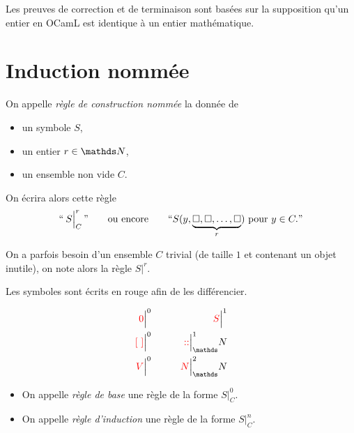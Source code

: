 Les preuves de correction et de terminaison sont basées sur la supposition qu'un entier en OCamL est identique à un entier mathématique.

\section{Induction nommée}

\begin{defn}
	On appelle {\it règle de construction nommée}\/ la donnée de
	\begin{itemize}
		\item un symbole $S$,
		\item un entier $r \in \N$,
		\item un ensemble non vide $C$.
	\end{itemize}
	On écrira alors cette règle \[
		``\:S \Big|_C^r\,\/"\qquad \text{ou encore} \qquad ``S(y, \underbrace{\square,\square,\ldots,\square}_{r}) \text{ pour } y \in C."
	\]
\end{defn}

\begin{rmk}
	On a parfois besoin d'un ensemble $C$\/ trivial (de taille $1$\/ et contenant un objet inutile), on note alors la règle $S\Big|^r$.
\end{rmk}

\begin{exm}
	Les symboles sont écrits en {\color{red} rouge} afin de les différencier.

	\begin{align*}
		{\color{red} 0}\Big|^0 &\qquad& {\color{red} S}\Big|^1\\
		{\color{red} [~]}\Big|^0 &\qquad& {\color{red} {::}}\Big|^1_\N\\
		{\color{red} V}\Big|^0 &\qquad& {\color{red} N}\Big|^2_\N
	\end{align*}
\end{exm}

\begin{defn}
	\begin{itemize}
		\item On appelle {\it règle de base}\/ une règle de la forme $S\big|_C^0$.
		\item On appelle {\it règle d'induction}\/ une règle de la forme $S\big|_C^n$.
	\end{itemize}
\end{defn}

